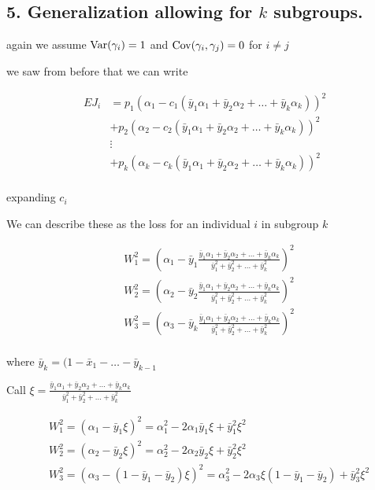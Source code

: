 
\subsection*{5. Generalization allowing for $k$ subgroups.}

again we assume $\mathrm{Var}(\gamma_i) = 1$ and $\mathrm{Cov}(\gamma_i, \gamma_j) = 0$ for $i \neq j$

we saw from before that we can write

\begin{align*}
	E J_i &= p_1 ( \alpha_1 - c_1 (\bar{y}_1 \alpha_1 + \bar{y}_2 \alpha_2 + \ldots + \bar{y}_k \alpha_k ))^2 \\
		  &+ p_2 ( \alpha_2 - c_2 (\bar{y}_1 \alpha_1 +  \bar{y}_2 \alpha_2 + \ldots + \bar{y}_k \alpha_k ))^2 \\
		  &\vdots \\
		  &+ p_k ( \alpha_k - c_k (\bar{y}_1 \alpha_1 +\bar{y}_2 \alpha_2 +  \ldots + \bar{y}_k \alpha_k ))^2 \\
\end{align*}

expanding $c_i$ 

We can describe these as the loss for an individual $i$ in subgroup $k$ 

\begin{align*}
		  &W_1^2=  \left( \alpha_1 -  \bar{y}_1\frac{ \bar{y}_1 \alpha_1 + \bar{y}_2 \alpha_2 + \ldots + \bar{y}_k \alpha_k }{\bar{y}_1^2 + \bar{y}_2^2 + \ldots + \bar{y}_k^2} \right)^2 \\
		  &W_2^2= \left( \alpha_2 -  \bar{y}_2\frac{ \bar{y}_1 \alpha_1 + \bar{y}_2 \alpha_2 + \ldots + \bar{y}_k \alpha_k }{\bar{y}_1^2 + \bar{y}_2^2 + \ldots + \bar{y}_k^2} \right)^2 \\
		  &W_3^2 = \left( \alpha_3 - \bar{y}_k\frac{ \bar{y}_1 \alpha_1 + \bar{y}_2 \alpha_2 + \ldots + \bar{y}_k \alpha_k }{\bar{y}_1^2 + \bar{y}_2^2 + \ldots + \bar{y}_k^2} \right)^2 \\
\end{align*} 

where $\bar{y}_k = (1 - \bar{x}_1 - \ldots - \bar{y}_{k-1}$


Call $\xi = \frac{ \bar{y}_1 \alpha_1 + \bar{y}_2 \alpha_2 + \ldots + \bar{y}_k \alpha_k }{\bar{y}_1^2 + \bar{y}_2^2 + \ldots + \bar{y}_k^2}$


\begin{align*}
		  &W_1^2=  \left( \alpha_1 -  \bar{y}_1 \xi \right)^2 = \alpha_1^2 - 2 \alpha_1 \bar{y}_1 \xi + \bar{y}_1^2 \xi^2 \\
		  &W_2^2= \left( \alpha_2 -  \bar{y}_2 \xi \right)^2 = \alpha_2^2 - 2 \alpha_2 \bar{y}_2 \xi + \bar{y}_2^2 \xi^2 \\
		  &W_3^2 = \left( \alpha_3 - (1 - \bar{y}_1 - \bar{y}_2) \xi \right)^2 = \alpha_3^2 - 2 \alpha_3 \xi(1 - \bar{y}_1 - \bar{y}_2)  + \bar{y}_3^2 \xi^2 \\
\end{align*} 

